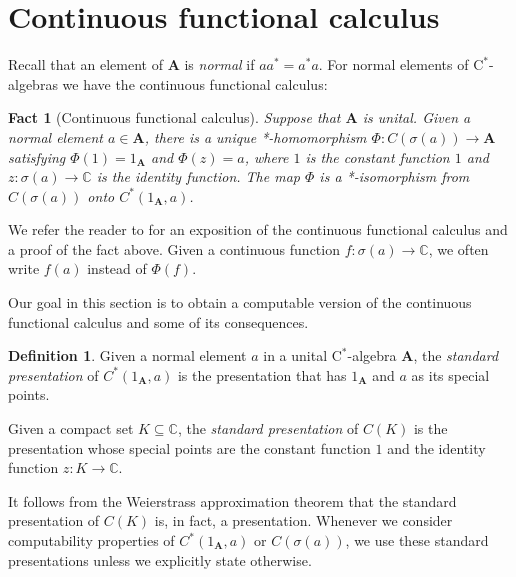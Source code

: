 \documentclass{amsart}
\newcommand{\boldA}{\mathbf{A}}
\newcommand{\cstar}{$\mathrm{C}^*$}
\theoremstyle{plain}
\newtheorem{fact}[theorem]{Fact}
\theoremstyle{definition}
\newtheorem{definition}[theorem]{Definition}
\numberwithin{equation}{section}
\begin{document}
\section{Continuous functional calculus}
Recall that an element of $\boldA$ is \emph{normal} if $aa^* = a^*a$.  For normal elements of \cstar-algebras we have the continuous functional calculus:

\begin{fact}[Continuous functional calculus]
Suppose that $\boldA$ is unital.  Given a normal element $a \in \boldA$, there is a unique *-homomorphism $\Phi : C(\sigma(a)) \to \boldA$ satisfying $\Phi(1) = 1_\boldA$ and $\Phi(z) = a$, where $1$ is the constant function $1$ and $z : \sigma(a) \to \mathbb{C}$ is the identity function.  The map $\Phi$ is a *-isomorphism from $C(\sigma(a))$ onto $C^*(1_\boldA, a)$.
\end{fact}

We refer the reader to \cite[Section 2.1]{Murphy.1990} for an exposition of the continuous functional calculus and a proof of the fact above.  Given a continuous function $f : \sigma(a) \to \mathbb{C}$, we often write $f(a)$ instead of $\Phi(f)$.

Our goal in this section is to obtain a computable version of the continuous functional calculus and some of its consequences.  

\begin{definition}
Given a normal element $a$ in a unital \cstar-algebra $\boldA$, the \emph{standard presentation} of $C^*(1_\boldA, a)$ is the presentation that has $1_\boldA$ and $a$ as its special points.

Given a compact set $K \subseteq \mathbb{C}$, the \emph{standard presentation} of $C(K)$ is the presentation whose special points are the constant function $1$ and the identity function $z : K \to \mathbb{C}$.
\end{definition}

It follows from the Weierstrass approximation theorem that the standard presentation of $C(K)$ is, in fact, a presentation.  Whenever we consider computability properties of $C^*(1_\boldA, a)$ or $C(\sigma(a))$, we use these standard presentations unless we explicitly state otherwise.
\end{document}
